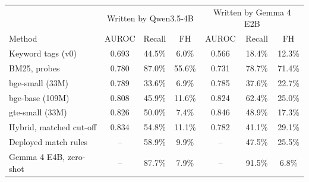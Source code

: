 \begin{tabular*}{\textwidth}{@{\extracolsep{\fill}}lcccccc@{}}
\toprule
& \multicolumn{3}{c}{Written by Qwen3.5-4B} & \multicolumn{3}{c}{Written by Gemma 4 E2B}\\ Method & AUROC & Recall & FH & AUROC & Recall & FH\\
\midrule
Keyword tags (v0) & 0.693 & 44.5\% & 6.0\% & 0.566 & 18.4\% & 12.3\%\\
BM25, probes & 0.780 & 87.0\% & 55.6\% & 0.731 & 78.7\% & 71.4\%\\
bge-small (33M) & 0.789 & 33.6\% & 6.9\% & 0.785 & 37.6\% & 22.7\%\\
bge-base (109M) & 0.808 & 45.9\% & 11.6\% & 0.824 & 62.4\% & 25.0\%\\
gte-small (33M) & 0.826 & 50.0\% & 7.4\% & 0.846 & 48.9\% & 17.3\%\\
Hybrid, matched cut-off & 0.834 & 54.8\% & 11.1\% & 0.782 & 41.1\% & 29.1\%\\
\midrule
Deployed match rules & -- & 58.9\% & 9.9\% & -- & 47.5\% & 25.5\%\\
Gemma 4 E4B, zero-shot & -- & 87.7\% & 7.9\% & -- & 91.5\% & 6.8\%\\
\bottomrule
\end{tabular*}
